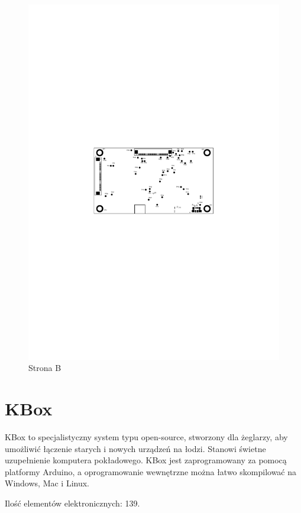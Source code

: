 \begin{figure}[!htb]
\begin{minipage}{0.5\textwidth}
		\includegraphics[width=0.95\linewidth,clip, trim=5.5cm 12cm 5.5cm 11cm]{./chapters/chapter5/Jetson_B.pdf}
		\caption{Strona B}\label{chilli:StronaB}
	\end{minipage}
\end{figure}

\section{KBox}
KBox to specjalistyczny system typu open-source, stworzony dla żeglarzy, aby umożliwić łączenie starych i nowych urządzeń na łodzi. Stanowi świetne uzupełnienie komputera pokładowego. KBox jest zaprogramowany za pomocą platformy Arduino, a oprogramowanie wewnętrzne można łatwo skompilować na Windows, Mac i Linux.

\breakparagraph{}
Ilość elementów elektronicznych: 139.

